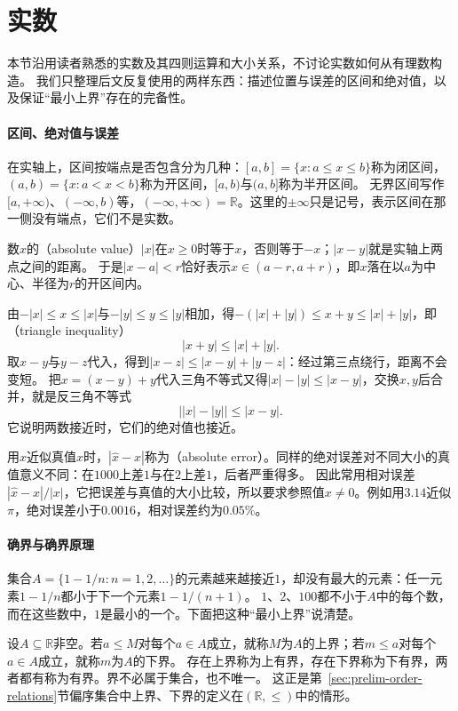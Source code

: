 \section{实数}
\label{sec:ru-real-numbers}
\label{sec:real-valued-functions-bounds}

本节沿用读者熟悉的实数及其四则运算和大小关系，不讨论实数如何从有理数构造。
我们只整理后文反复使用的两样东西：描述位置与误差的区间和绝对值，以及保证“最小上界”存在的完备性。

\paragraph{区间、绝对值与误差}
在实轴上，区间按端点是否包含分为几种：$[a,b]=\{x:a\leq x\leq b\}$称为闭区间，$(a,b)=\{x:a<x<b\}$称为开区间，$[a,b)$与$(a,b]$称为半开区间。
无界区间写作$[a,+\infty)$、$(-\infty,b)$等，$(-\infty,+\infty)=\mathbb R$。这里的$\pm\infty$只是记号，表示区间在那一侧没有端点，它们不是实数。

数$x$的（absolute value）$|x|$在$x\geq0$时等于$x$，否则等于$-x$；$|x-y|$就是实轴上两点之间的距离。
于是$|x-a|<r$恰好表示$x\in(a-r,a+r)$，即$x$落在以$a$为中心、半径为$r$的开区间内。

由$-|x|\leq x\leq|x|$与$-|y|\leq y\leq|y|$相加，得$-(|x|+|y|)\leq x+y\leq|x|+|y|$，即（triangle inequality）
\[
 |x+y|\leq|x|+|y|.
\]
取$x-y$与$y-z$代入，得到$|x-z|\leq|x-y|+|y-z|$：经过第三点绕行，距离不会变短。
把$x=(x-y)+y$代入三角不等式又得$|x|-|y|\leq|x-y|$，交换$x,y$后合并，就是反三角不等式
\[
 \bigl||x|-|y|\bigr|\leq|x-y|.
\]
它说明两数接近时，它们的绝对值也接近。

用$\hat x$近似真值$x$时，$|\hat x-x|$称为（absolute error）。同样的绝对误差对不同大小的真值意义不同：在$1000$上差$1$与在$2$上差$1$，后者严重得多。
因此常用相对误差$|\hat x-x|/|x|$，它把误差与真值的大小比较，所以要求参照值$x\neq0$。例如用$3.14$近似$\pi$，绝对误差小于$0.0016$，相对误差约为$0.05\%$。

\paragraph{确界与确界原理}
\label{sec:ru-supremum-completeness}
集合$A=\{1-1/n:n=1,2,\ldots\}$的元素越来越接近$1$，却没有最大的元素：任一元素$1-1/n$都小于下一个元素$1-1/(n+1)$。
$1$、$2$、$100$都不小于$A$中的每个数，而在这些数中，$1$是最小的一个。下面把这种“最小上界”说清楚。

设$A\subseteq\mathbb R$非空。若$a\leq M$对每个$a\in A$成立，就称$M$为$A$的上界；若$m\leq a$对每个$a\in A$成立，就称$m$为$A$的下界。
存在上界称为上有界，存在下界称为下有界，两者都有称为有界。界不必属于集合，也不唯一。
这正是第~\ref{sec:prelim-order-relations}节偏序集合中上界、下界的定义在$(\mathbb R,\leq)$中的情形。

